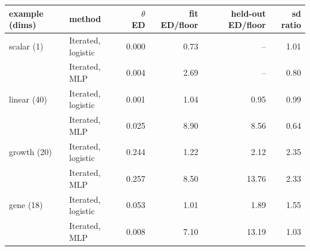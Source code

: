 \begin{tabular}{llrrrr}
\toprule
example (dims) & method & $\theta$ ED & fit ED/floor & held-out ED/floor & sd ratio \\
\midrule
scalar (1) & Iterated, logistic & 0.000 & 0.73 & -- & 1.01 \\
 & Iterated, MLP & 0.004 & 2.69 & -- & 0.80 \\ \addlinespace
linear (40) & Iterated, logistic & 0.001 & 1.04 & 0.95 & 0.99 \\
 & Iterated, MLP & 0.025 & 8.90 & 8.56 & 0.64 \\ \addlinespace
growth (20) & Iterated, logistic & 0.244 & 1.22 & 2.12 & 2.35 \\
 & Iterated, MLP & 0.257 & 8.50 & 13.76 & 2.33 \\ \addlinespace
gene (18) & Iterated, logistic & 0.053 & 1.01 & 1.89 & 1.55 \\
 & Iterated, MLP & 0.008 & 7.10 & 13.19 & 1.03 \\
\bottomrule
\end{tabular}
